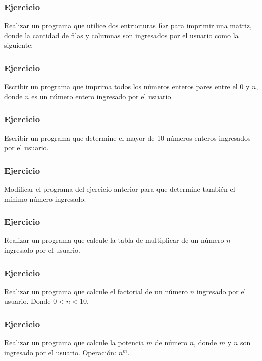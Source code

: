 \subsubsection{Ejercicio}
Realizar un programa que utilice dos entructuras \textbf{for} para imprimir una matriz, donde la cantidad de filas y columnas son ingresados por el usuario como la siguiente:
{\small
  \lstset{inputencoding=utf8/latin1}
  
}

\subsubsection{Ejercicio}
Escribir un programa que imprima todos los números enteros pares entre el 0 y $n$, donde $n$ es un número entero ingresado por el usuario.
{\small
  \lstset{inputencoding=utf8/latin1}
  
}

\subsubsection{Ejercicio}
Escribir un programa que determine el mayor de 10 números enteros ingresados por el usuario.
{\small
  \lstset{inputencoding=utf8/latin1}
  
}

\subsubsection{Ejercicio}
Modificar el programa del ejercicio anterior para que determine también el mínimo número ingresado.
{\small
  \lstset{inputencoding=utf8/latin1}
  
}

\subsubsection{Ejercicio}
Realizar un programa que calcule la tabla de multiplicar de un número $n$ ingresado por el usuario.
{\small
  \lstset{inputencoding=utf8/latin1}
  
}

\subsubsection{Ejercicio}
Realizar un programa que calcule el factorial de un número $n$ ingresado por el usuario. Donde $0<n<10$.
{\small
  \lstset{inputencoding=utf8/latin1}
  
}

\subsubsection{Ejercicio }
Realizar un programa que calcule la potencia $m$ de número $n$, donde $m$ y $n$ son ingresado por el usuario. Operación: $n^m$.
{\small
  \lstset{inputencoding=utf8/latin1}
  
}


